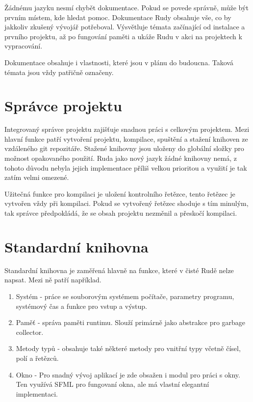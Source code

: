 \documentclass[12pt, a4paper,
twoside,        %
openright
]{report}
\begin{document}
Žádnému jazyku nesmí chybět dokumentace. Pokud se povede správně, může být prvním místem, kde hledat pomoc. Dokumentace Rudy obsahuje vše, co by jakkoliv zkušený vývojář potřeboval. Výsvětluje témata začínající od instalace a prvního projektu, až po fungování paměti a ukáže Rudu v akci na projektech k vypracování.

Dokumentace obsahuje i vlastnosti, které jsou v plánu do budoucna. Taková témata jsou vždy patřičně označeny.

\section{Správce projektu}

Integrovaný správce projektu zajišťuje snadnou práci s celkovým projektem. Mezi hlavní funkce patří vytvoření projektu, kompilace, spuštění a stažení knihoven ze vzdáleného git repozitáře. Stažené knihovny jsou uloženy do globální složky pro možnost opakovaného použití. Ruda jako nový jazyk žádné knihovny nemá, z tohoto důvodu nebyla jejich implementace příliš velkou prioritou a využití je tak zatím velmi omezené.

Užitečná funkce pro kompilaci je uložení kontrolního řetězce, tento řetězec je vytvořen vždy při kompilaci. Pokud se vytvořený řetězec shoduje s tím minulým, tak správce předpokládá, že se obsah projektu nezměnil a přeskočí kompilaci.

\clearpage

\section{Standardní knihovna}

Standardní knihovna je zaměřená hlavně na funkce, které v čisté Rudě nelze napsat. 
Mezi ně patří například.

\begin{enumerate}
	\item Systém - práce se souborovým systémem počítače, parametry programu, systémový čas a funkce pro vstup a výstup.
	\item Paměť - správa paměti runtimu. Slouží primárně jako abstrakce pro garbage collector.
	\item Metody typů - obsahuje také některé metody pro vnitřní typy včetně čísel, polí a řetězců.
	\item Okno - Pro snadný vývoj aplikací je zde obsažen i modul pro práci s okny. Ten využívá SFML pro fungovaní okna, ale má vlastní elegantní implementaci.
\end{enumerate}
\end{document}
